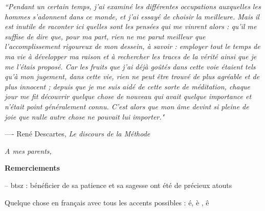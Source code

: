\documentclass[12pt]{book}
\title{}
\date{}
\author{}
\begin{document}
\thispagestyle{empty}

\vspace*{5cm}

\textit{``Pendant un certain temps, j'ai examin\'e les diff\'erentes
occupations auxquelles les hommes s'adonnent dans ce monde, et j'ai
essay\'e de choisir la meilleure. Mais il est inutile de raconter ici
quelles sont les pens\'ees qui me vinrent alors : qu'il me suffise de
dire que, pour ma part, rien ne me parut meilleur que
l'accomplissement rigoureux de mon dessein, \`a savoir : employer tout
le temps de ma vie \`a d\'evelopper ma raison et \`a rechercher les
traces de la v\'erit\'e ainsi que je me l'\'etais propos\'e. Car les
fruits que j'ai d\'ej\`a go\^ut\'es dans cette voie \'etaient tels
qu'\`a mon jugement, dans cette vie, rien ne peut \^etre trouv\'e de
plus agr\'eable et de plus innocent ; depuis que je me suis aid\'e de
cette sorte de m\'editation, chaque jour me fit d\'ecouvrir quelque
chose de nouveau qui avait quelque importance et n'\'etait point
g\'en\'eralement connu. C'est alors que mon \^ame devint si pleine de
joie que nulle autre chose ne pouvait lui importer."}

\vspace*{1cm}

\hspace{4cm} ---- Ren\'e Descartes, \textit{Le discours de la M\'ethode}

\newpage

\thispagestyle{empty}
\quad 
\newpage

\thispagestyle{empty}
\vspace*{9cm}
\hspace{6cm} \textit{A mes parents,}
\newpage

\thispagestyle{empty}
\vspace*{.5cm}
\huge \textbf{Remerciements} \normalsize
\vspace*{1cm}


-- btsz : b\'en\'eficier de sa patience et sa sagesse ont \'et\'e de
pr\'ecieux atouts

Quelque chose en français avec tous les accents possibles : \'e, è , \^e 
\end{document}
